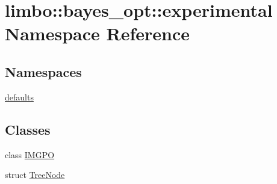 \hypertarget{namespacelimbo_1_1bayes__opt_1_1experimental}{}\section{limbo\+:\+:bayes\+\_\+opt\+:\+:experimental Namespace Reference}
\label{namespacelimbo_1_1bayes__opt_1_1experimental}
\subsection*{Namespaces}
\begin{DoxyCompactItemize}
\item 
 \hyperlink{namespacelimbo_1_1bayes__opt_1_1experimental_1_1defaults}{defaults}
\end{DoxyCompactItemize}
\subsection*{Classes}
\begin{DoxyCompactItemize}
\item 
class \hyperlink{classlimbo_1_1bayes__opt_1_1experimental_1_1_i_m_g_p_o}{I\+M\+G\+P\+O}
\item 
struct \hyperlink{structlimbo_1_1bayes__opt_1_1experimental_1_1_tree_node}{Tree\+Node}
\end{DoxyCompactItemize}

